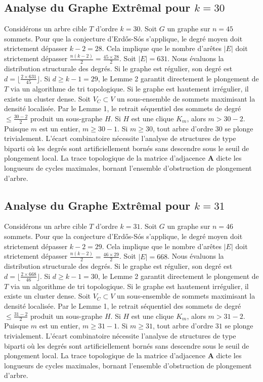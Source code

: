 \documentclass[11pt,a4paper]{article}
\begin{document}
\subsection{Analyse du Graphe Extr\^emal pour $k=30$}
Consid\'erons un arbre cible $T$ d'ordre $k=30$.
Soit $G$ un graphe sur $n=45$ sommets.
Pour que la conjecture d'Erd\H{o}s-S\'os s'applique, le degr\'e moyen doit strictement d\'epasser $k-2 = 28$.
Cela implique que le nombre d'ar\^etes $|E|$ doit strictement d\'epasser $\frac{n(k-2)}{2} = \frac{45 \times 28}{2}$.
Soit $|E| = 631$.
Nous \'evaluons la distribution structurale des degr\'es. Si le graphe est r\'egulier, son degr\'e est $d = \lfloor \frac{2 \times 631}{45} \rfloor$.
Si $d \geq k-1 = 29$, le Lemme 2 garantit directement le plongement de $T$ via un algorithme de tri topologique.
Si le graphe est hautement irr\'egulier, il existe un cluster dense. Soit $V_C \subset V$ un sous-ensemble de sommets maximisant la densit\'e localis\'ee.
Par le Lemme 1, le retrait s\'equentiel des sommets de degr\'e $\leq \frac{30-2}{2}$ produit un sous-graphe $H$.
Si $H$ est une clique $K_{m}$, alors $m > 30-2$. Puisque $m$ est un entier, $m \geq 30-1$. Si $m \geq 30$, tout arbre d'ordre $30$ se plonge trivialement.
L'\'ecart combinatoire n\'ecessite l'analyse de structures de type biparti o\`u les degr\'es sont artificiellement born\'es sans descendre sous le seuil de plongement local. La trace topologique de la matrice d'adjacence $\mathbf{A}$ dicte les longueurs de cycles maximales, bornant l'ensemble d'obstruction de plongement d'arbre.


\subsection{Analyse du Graphe Extr\^emal pour $k=31$}
Consid\'erons un arbre cible $T$ d'ordre $k=31$.
Soit $G$ un graphe sur $n=46$ sommets.
Pour que la conjecture d'Erd\H{o}s-S\'os s'applique, le degr\'e moyen doit strictement d\'epasser $k-2 = 29$.
Cela implique que le nombre d'ar\^etes $|E|$ doit strictement d\'epasser $\frac{n(k-2)}{2} = \frac{46 \times 29}{2}$.
Soit $|E| = 668$.
Nous \'evaluons la distribution structurale des degr\'es. Si le graphe est r\'egulier, son degr\'e est $d = \lfloor \frac{2 \times 668}{46} \rfloor$.
Si $d \geq k-1 = 30$, le Lemme 2 garantit directement le plongement de $T$ via un algorithme de tri topologique.
Si le graphe est hautement irr\'egulier, il existe un cluster dense. Soit $V_C \subset V$ un sous-ensemble de sommets maximisant la densit\'e localis\'ee.
Par le Lemme 1, le retrait s\'equentiel des sommets de degr\'e $\leq \frac{31-2}{2}$ produit un sous-graphe $H$.
Si $H$ est une clique $K_{m}$, alors $m > 31-2$. Puisque $m$ est un entier, $m \geq 31-1$. Si $m \geq 31$, tout arbre d'ordre $31$ se plonge trivialement.
L'\'ecart combinatoire n\'ecessite l'analyse de structures de type biparti o\`u les degr\'es sont artificiellement born\'es sans descendre sous le seuil de plongement local. La trace topologique de la matrice d'adjacence $\mathbf{A}$ dicte les longueurs de cycles maximales, bornant l'ensemble d'obstruction de plongement d'arbre.
\end{document}
